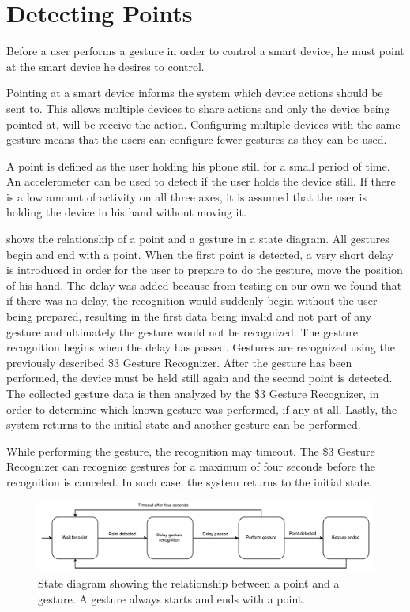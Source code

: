 \section{Detecting Points}\label{sec:detecting-points}

Before a user performs a gesture in order to control a smart device, 
he must point at the smart device he desires to control. 

Pointing at a smart device informs the system which device actions should be sent to. This allows multiple devices to share actions and only the device being pointed at, will be receive the action. Configuring multiple devices with the same gesture means that the users can configure fewer gestures as they can be used.

A point is defined as the user holding his phone still for a small period of time. 
An accelerometer can be used to detect if the user holds the device still. 
If there is a low amount of activity on all three axes, 
it is assumed that the user is holding the device in his hand without moving it.

 shows the relationship of a point and a gesture in a state diagram. 
All gestures begin and end with a point. 
When the first point is detected, 
a very short delay is introduced in order for the user to prepare to do the gesture, 
\eg move the position of his hand. 
The delay was added because from testing on our own we found that if there was no delay, the recognition would suddenly begin without the user being prepared, resulting in the first data being invalid and not part of any gesture and ultimately the gesture would not be recognized.
The gesture recognition begins when the delay has passed. 
Gestures are recognized using the previously described \$3 Gesture Recognizer. 
After the gesture has been performed, 
the device must be held still again and the second point is detected. 
The collected gesture data is then analyzed by the \$3 Gesture Recognizer, 
in order to determine which known gesture was performed, if any at all. 
Lastly, the system returns to the initial state and another gesture can be performed.

While performing the gesture, the recognition may timeout. 
The \$3 Gesture Recognizer can recognize gestures for a maximum of four seconds before the recognition is canceled. 
In such case, the system returns to the initial state.

\begin{figure}[h]
\centering
\includegraphics[width=\textwidth]{images/point-to-gesture-state-diagram}
\caption{State diagram showing the relationship between a point and a gesture. A gesture always starts and ends with a point.}
\label{fig:point-to-gesture-state-diagram}
\end{figure}

